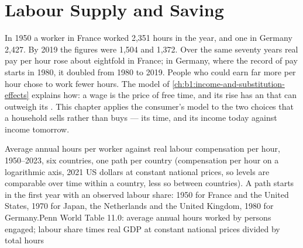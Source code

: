 \chapter{Labour Supply and Saving}\label{ch:b1:labour-supply-and-saving}

In 1950 a worker in France worked 2,351 hours in the year, and one in
Germany 2,427. By 2019 the figures were 1,504 and 1,372. Over the same
seventy years real pay per hour rose about eightfold in France; in Germany,
where the record of pay starts in 1980, it doubled from 1980 to
2019. %
People who could earn far more per hour chose to work fewer hours. The
model of \cref{ch:b1:income-and-substitution-effects} explains how: a wage
is the price of free time, and its rise has an  that can
outweigh its . This chapter applies the consumer's model
to the two choices that a household sells rather than buys --- its time,
and its income today against income tomorrow.

\begin{openingchart}{Average annual hours per worker against real labour
compensation per hour, 1950--2023, six countries, one path per country
(compensation per hour on a logarithmic axis, 2021 US dollars at constant
national prices, so levels are comparable over time within a country, less
so between countries). A path starts in the first year with an observed
labour share: 1950 for France and the United States, 1970 for Japan, the
Netherlands and the United Kingdom, 1980 for Germany.}{Penn World Table 11.0: average annual hours worked
by persons engaged; labour share times real GDP at constant national prices
divided by total hours}
\end{openingchart}

